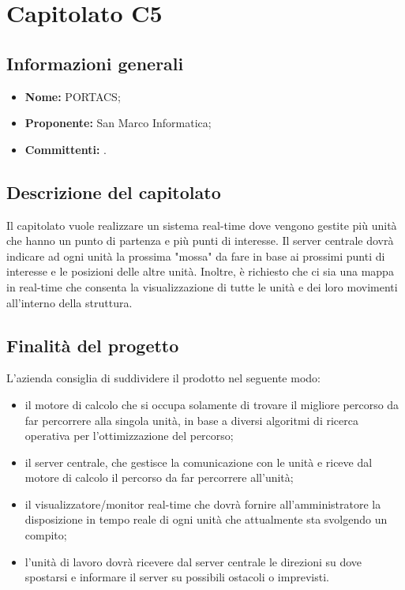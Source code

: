 \section{Capitolato C5}

\subsection{Informazioni generali}
\begin{itemize}
\item \textbf{Nome:} PORTACS;
\item \textbf{Proponente:} San Marco Informatica;
\item \textbf{Committenti:} \committenti{}.
\end{itemize}

\subsection{Descrizione del capitolato}
Il capitolato vuole realizzare un sistema real-time dove vengono gestite più unità che hanno un punto di partenza e più punti di interesse.
Il server centrale dovrà indicare ad ogni unità la prossima "mossa" da fare in base ai prossimi punti di interesse e le posizioni delle altre unità. 
Inoltre, è richiesto che ci sia una mappa in real-time che consenta la visualizzazione di tutte le unità e dei loro movimenti all'interno della struttura.

\subsection{Finalità del progetto}
L'azienda consiglia di suddividere il prodotto nel seguente modo:
\begin{itemize}
\item il motore di calcolo che si occupa solamente di trovare il migliore percorso da far percorrere alla singola unità, in base a diversi algoritmi di ricerca operativa per l'ottimizzazione del percorso;
\item il server centrale, che gestisce la comunicazione con le unità e riceve dal motore di calcolo il percorso da far percorrere all'unità;
\item il visualizzatore/monitor real-time che dovrà fornire all'amministratore la disposizione in tempo reale di ogni unità che attualmente sta svolgendo un compito;
\item l'unità di lavoro dovrà ricevere dal server centrale le direzioni su dove spostarsi e informare il server su possibili ostacoli o imprevisti.
\end{itemize}

